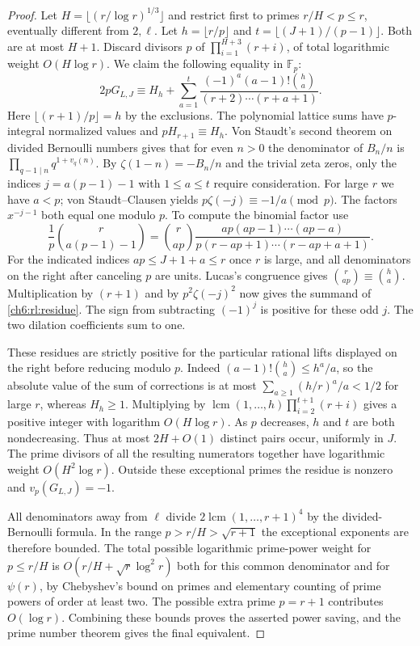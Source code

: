 \documentclass[11pt,a4paper,oneside,openany]{report}
\theoremstyle{remark}\newtheorem{remark}[theorem]{Remark}
\numberwithin{equation}{section}
\begin{document}
\begin{proof}
Let $H=\lfloor(r/\log r)^{1/3}\rfloor$ and restrict first to
primes $r/H<p\le r$, eventually different from $2,\ell$.
Let $h=\lfloor r/p\rfloor$ and $t=\lfloor(J+1)/(p-1)\rfloor$.
Both are at most $H+1$. Discard divisors $p$ of
$\prod_{i=1}^{H+3}(r+i)$, of total logarithmic weight $O(H\log r)$.
We claim the following equality in $\mathbb F_p$:
\begin{equation}\label{ch6:rl:residue}
 2p G_{L,J}\equiv H_h+
  \sum_{a=1}^t
   \frac{(-1)^a(a-1)!\binom ha}{(r+2)\cdots(r+a+1)} .
\end{equation}
Here $\lfloor(r+1)/p\rfloor=h$ by the exclusions. The polynomial
lattice sums have $p$-integral normalized values and $pH_{r+1}\equiv H_h$.
Von Staudt's second theorem on divided Bernoulli numbers gives that
for even $n>0$ the denominator of $B_n/n$ is
$\prod_{q-1\mid n}q^{1+v_q(n)}$.
By $\zeta(1-n)=-B_n/n$ and the trivial zeta zeros, only the indices
$j=a(p-1)-1$ with $1\le a\le t$ require consideration. For large
$r$ we have $a<p$; von Staudt--Clausen yields
$p\zeta(-j)\equiv -1/a\pmod p$. The factors $x^{-j-1}$ both equal
one modulo $p$. To compute the binomial factor use
\[
 \frac1p\binom r{a(p-1)-1}
  =\binom r{ap}
     \frac{ap(ap-1)\cdots(ap-a)}
          {p(r-ap+1)\cdots(r-ap+a+1)}.
\]
For the indicated indices $ap\le J+1+a\le r$ once $r$ is large,
and all denominators on the right after canceling $p$ are units.
Lucas's congruence gives $\binom r{ap}\equiv\binom ha$.
Multiplication by $(r+1)$ and by $p^2\zeta(-j)^2$ now gives the
summand of \eqref{ch6:rl:residue}. The sign from subtracting $(-1)^j$ is
positive for these odd $j$. The two dilation coefficients sum to one.

These residues are strictly positive for the particular rational lifts displayed on the right before reducing
modulo $p$. Indeed $(a-1)!\binom ha\le h^a/a$, so the absolute value
of the sum of corrections is at most
$\sum_{a\ge1}(h/r)^a/a<1/2$ for large $r$, whereas $H_h\ge1$.
Multiplying by $\operatorname{lcm}(1,\ldots,h)
\prod_{i=2}^{t+1}(r+i)$ gives a positive integer with logarithm
$O(H\log r)$. As $p$ decreases, $h$ and $t$ are both nondecreasing.
Thus at most $2H+O(1)$ distinct pairs occur, uniformly in $J$.
The prime divisors of all the resulting numerators together have
logarithmic weight $O(H^2\log r)$. Outside these exceptional primes
the residue is nonzero and $v_p(G_{L,J})=-1$.

All denominators away from $\ell$ divide
$2\operatorname{lcm}(1,\ldots,r+1)^4$ by the divided-Bernoulli
formula. In the range $p>r/H>\sqrt{r+1}$ the exceptional exponents
are therefore bounded. The total possible logarithmic prime-power
weight for $p\le r/H$ is $O(r/H+\sqrt r\log^2r)$ both for this
common denominator and for $\psi(r)$, by Chebyshev's bound on primes
and elementary counting of prime powers of order at least two.
The possible extra prime $p=r+1$ contributes $O(\log r)$.
Combining these bounds proves the asserted power saving, and the
prime number theorem gives the final equivalent.


\end{proof}
\end{document}
